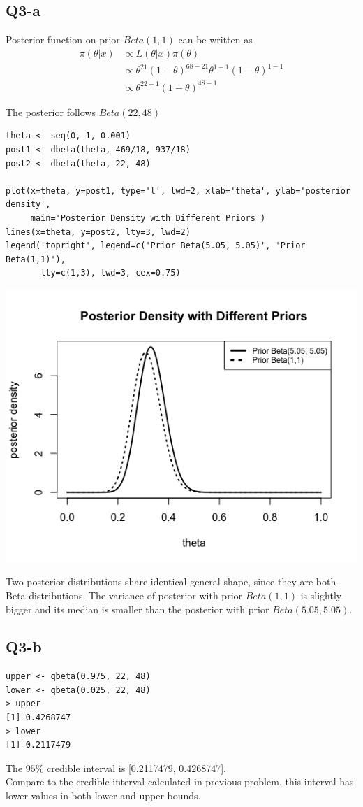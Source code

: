 \documentclass[11pt,letterpaper]{article}
\begin{document}
\subsection*{Q3-a}
\noindent Posterior function on prior $Beta(1,1)$ can be written as
\begin{align*}
\pi(\theta | x) &\propto L(\theta | x)\pi(\theta)\\
&\propto \theta^{21} (1- \theta)^{68-21} \theta^{1 - 1} (1- \theta)^{1 - 1} \\
&\propto \theta^{22 - 1} (1 - \theta)^{48 - 1}
\end{align*}

\noindent The posterior follows $Beta(22, 48)$

\begin{verbatim}
theta <- seq(0, 1, 0.001)
post1 <- dbeta(theta, 469/18, 937/18)
post2 <- dbeta(theta, 22, 48)

plot(x=theta, y=post1, type='l', lwd=2, xlab='theta', ylab='posterior density', 
     main='Posterior Density with Different Priors')
lines(x=theta, y=post2, lty=3, lwd=2)
legend('topright', legend=c('Prior Beta(5.05, 5.05)', 'Prior Beta(1,1)'), 
       lty=c(1,3), lwd=3, cex=0.75)
\end{verbatim}

\includegraphics[width=150mm]{q3-a.png}

\noindent Two posterior distributions share identical general shape, since they are both Beta distributions. The variance of posterior with prior $Beta(1, 1)$ is slightly bigger and its median is smaller than the posterior with prior $Beta(5.05, 5.05)$.

\newpage
\subsection*{Q3-b}
\begin{verbatim}
upper <- qbeta(0.975, 22, 48)
lower <- qbeta(0.025, 22, 48)
> upper
[1] 0.4268747
> lower
[1] 0.2117479
\end{verbatim}

\noindent The $95 \%$ credible interval is [0.2117479, 0.4268747]. \\
\noindent Compare to the credible interval calculated in previous problem, this interval has lower values in both lower and upper bounds.
\end{document}
